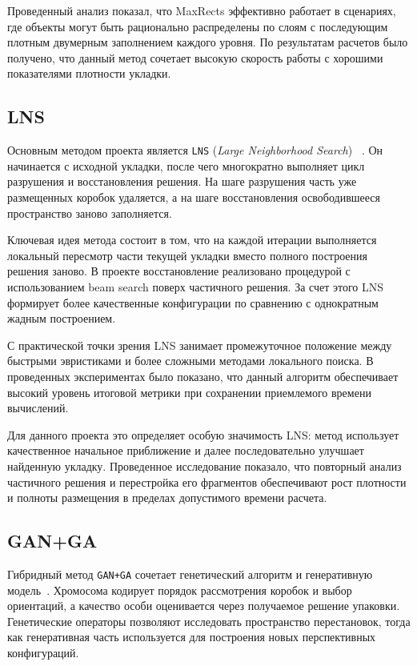\documentclass[14pt,a4paper]{extarticle}
\begin{document}
Проведенный анализ показал, что MaxRects эффективно работает в сценариях, где объекты могут быть рационально распределены по слоям с последующим плотным двумерным заполнением каждого уровня. По результатам расчетов было получено, что данный метод сочетает высокую скорость работы с хорошими показателями плотности укладки.

\subsection{LNS}

Основным методом проекта является \texttt{LNS} (\textit{Large Neighborhood Search})
\newline
~\cite{faroe2003,project_repo}. Он начинается с исходной укладки, после чего многократно выполняет цикл разрушения и восстановления решения. На шаге разрушения часть уже размещенных коробок удаляется, а на шаге восстановления освободившееся пространство заново заполняется.

Ключевая идея метода состоит в том, что на каждой итерации выполняется локальный пересмотр части текущей укладки вместо полного построения решения заново. В проекте восстановление реализовано процедурой с использованием beam search поверх частичного решения. За счет этого LNS формирует более качественные конфигурации по сравнению с однократным жадным построением.

С практической точки зрения LNS занимает промежуточное положение между быстрыми эвристиками и более сложными методами локального поиска. В проведенных экспериментах было показано, что данный алгоритм обеспечивает высокий уровень итоговой метрики при сохранении приемлемого времени вычислений.

Для данного проекта это определяет особую значимость LNS: метод использует качественное начальное приближение и далее последовательно улучшает найденную укладку. Проведенное исследование показало, что повторный анализ частичного решения и перестройка его фрагментов обеспечивают рост плотности и полноты размещения в пределах допустимого времени расчета.

\subsection{GAN+GA}

Гибридный метод \texttt{GAN+GA} сочетает генетический алгоритм и генеративную модель~\cite{ganga_paper,project_repo}. Хромосома кодирует порядок рассмотрения коробок и выбор ориентаций, а качество особи оценивается через получаемое решение упаковки. Генетические операторы позволяют исследовать пространство перестановок, тогда как генеративная часть используется для построения новых перспективных конфигураций.
\end{document}
